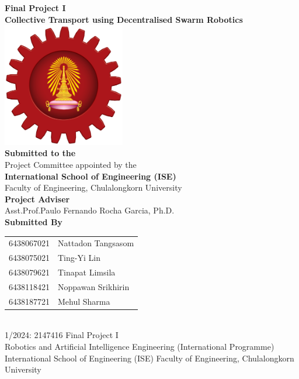 \begin{titlepage}
    \centering

    {\LARGE \textbf{Final Project I}}\\[1cm]
    {\Huge \textbf{Collective Transport using Decentralised Swarm Robotics}}\\[1cm]

    \includegraphics[width=0.4\textwidth]{midpoint_report/assets/images/ise_logo.png}\\[1cm] %
    
    \textbf{Submitted to the}\\[0.1cm]
    Project Committee appointed by the\\
    \textbf{International School of Engineering (ISE)}\\
    Faculty of Engineering, Chulalongkorn University\\[1cm]

    \textbf{Project Adviser}\\[0.1cm]
    Asst.Prof.Paulo Fernando Rocha Garcia, Ph.D.\\[1cm]

    \textbf{Submitted By}\\[0.5cm]
    \begin{tabular}{rl}
        6438067021 & Nattadon Tangsasom \\
        6438075021 & Ting-Yi Lin \\
        6438079621 & Tinapat Limsila \\
        6438118421 & Noppawan Srikhirin \\
        6438187721 & Mehul Sharma \\
    \end{tabular}\\[1cm]
    1/2024: 2147416 Final Project I\\
    Robotics and Artificial Intelligence Engineering (International Programme)\\
    International School of Engineering (ISE) Faculty of Engineering, Chulalongkorn University

\end{titlepage}
